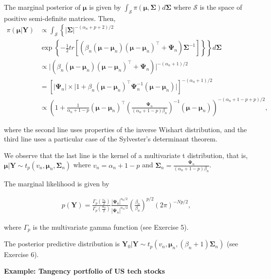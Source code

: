 \begin{enumerate}
The marginal posterior of $\bm{\mu}$ is given by $\int_{\mathcal{S}} \pi(\bm{\mu},\bm{\Sigma})d\bm{\Sigma}$ where $\mathcal{S}$ is the space of positive semi-definite matrices. Then,
{\footnotesize{
\begin{align}
	\pi(\bm{\mu}|\bm{Y})&\propto\int_{\mathcal{S}}\left\{|\bm{\Sigma}|^{-(\alpha_n+p+2)/2}\right.\nonumber\\
	&\left. \exp\left\{-\frac{1}{2}tr\left[\left(\beta_n\left(\bm{\mu}-\bm{\mu}_n\right)\left(\bm{\mu}-\bm{\mu}_n\right)^{\top}+\bm{\Psi}_n\right)\bm{\Sigma}^{-1}\right]\right\} \right\}d\bm{\Sigma}\nonumber\\
	&\propto \big\lvert\left(\beta_n\left(\bm{\mu}-\bm{\mu}_n\right)\left(\bm{\mu}-\bm{\mu}_n\right)^{\top}+\bm{\Psi}_n\right)\big\lvert^{-(\alpha_n+1)/2}\nonumber\\
	&=\left[\big\lvert\bm{\Psi}_n\big\lvert\times \big\lvert1+\beta_n\left(\bm{\mu}-\bm{\mu}_n\right)^{\top}\bm{\Psi}_n^{-1}\left(\bm{\mu}-\bm{\mu}_n\right)\big\lvert\right]^{-(\alpha_n+1)/2}\nonumber\\
	&\propto \left(1+\frac{1}{\alpha_n+1-p}\left(\bm{\mu}-\bm{\mu}_n\right)^{\top}\left(\frac{\bm{\Psi}_n}{(\alpha_n+1-p)\beta_n}\right)^{-1}\left(\bm{\mu}-\bm{\mu}_n\right)\right)^{-(\alpha_n+1-p+p)/2},\nonumber 
\end{align}
}}

where the second line uses properties of the inverse Wishart distribution, and the third line uses a particular case of the Sylvester's determinant theorem.

We observe that the last line is the kernel of a multivariate t distribution, that is, $\bm{\mu}|\bm{Y}\sim t_p(v_n,\bm{\mu}_n,\bm{\Sigma}_n)$ where $v_n=\alpha_n+1-p$ and $\bm{\Sigma}_n=\frac{\bm{\Psi}_n}{(\alpha_n+1-p)\beta_n}$.

The marginal likelihood is given by

\begin{align}
	p(\bm{Y})=\frac{\Gamma_p\left(\frac{v_n}{2}\right)}{\Gamma_p\left(\frac{\alpha_0}{2}\right)}\frac{|\bm{\Psi}_0|^{\alpha_0/2}}{|\bm{\Psi}_n|^{\alpha_n/2}}\left(\frac{\beta_0}{\beta_n}\right)^{p/2}(2\pi)^{-Np/2},\nonumber
\end{align}

where $\Gamma_p$ is the multivariate gamma function (see Exercise 5).

The posterior predictive distribution is $\bm{Y}_0|\bm{Y}\sim t_p(v_n,\bm{\mu}_n,(\beta_n+1)\bm{\Sigma}_n)$ (see Exercise 6).

\textbf{Example: Tangency portfolio of US tech stocks}


\end{enumerate}
